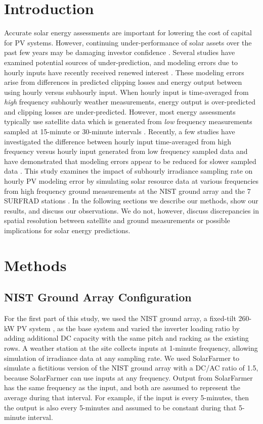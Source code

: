 \documentclass[conference]{IEEEtran}
\begin{document}
\section{Introduction}
Accurate solar energy assessments are important for lowering the cost of capital for PV systems. However, continuing under-performance of solar assets over the past few years may be damaging investor confidence \cite{Matsui2021}. Several studies have examined potential sources of under-prediction, and modeling errors due to hourly inputs have recently received renewed interest \cite{Parikh2021,Anderson2020,Bradford2020,Kharait2020,Cormode2019}. These modeling errors arise from differences in predicted clipping losses and energy output between using hourly versus subhourly input. When hourly input is time-averaged from \emph{high} frequency subhourly weather measurements, energy output is over-predicted and clipping losses are under-predicted. However, most energy assessments typically use satellite data which is generated from \emph{low} frequency measurements sampled at 15-minute or 30-minute intervals \cite{Wilcox2012,Sengupta2018}. Recently, a few studies have investigated the difference between hourly input time-averaged from high frequency versus hourly input generated from low frequency sampled data and have demonstrated that modeling errors appear to be reduced for slower sampled data \cite{Bowersox2021,osti_1797569}. This study examines the impact of subhourly irradiance sampling rate on hourly PV modeling error by simulating solar resource data at various frequencies from high frequency ground measurements at the NIST ground array \cite{Boyd2017,Boyd2017a,Boyd2017b} and the 7 SURFRAD stations \cite{Augustine2000}. In the following sections we describe our methods, show our results, and discuss our observations. We do not, however, discuss discrepancies in spatial resolution between satellite and ground measurements or possible implications for solar energy predictions.

\section{Methods}

\subsection{NIST Ground Array Configuration}
For the first part of this study, we used the NIST ground array, a fixed-tilt 260-kW PV system \cite{Boyd2017,Boyd2017a,Boyd2017b}, as the base system and varied the inverter loading ratio by adding additional DC capacity with the same pitch and racking as the existing rows. A weather station at the site collects inputs at 1-minute frequency, allowing simulation of irradiance data at any sampling rate. We used SolarFarmer \cite{solarfarmer2018} to simulate a fictitious version of the NIST ground array with a DC/AC ratio of 1.5, because SolarFarmer can use inputs at any frequency. Output from SolarFarmer has the same frequency as the input, and both are assumed to represent the average during that interval. For example, if the input is every 5-minutes, then the output is also every 5-minutes and assumed to be constant during that 5-minute interval.
\end{document}
